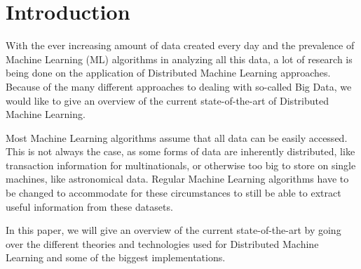 \section{Introduction}


With the ever increasing amount of data created every day and the prevalence of Machine Learning (ML) algorithms in analyzing all this data, a lot of research is being done on the application of Distributed Machine Learning approaches. Because of the many different approaches to dealing with so-called Big Data, we would like to give an overview of the current state-of-the-art of Distributed Machine Learning.

Most Machine Learning algorithms assume that all data can be easily accessed. This is not always the case, as some forms of data are inherently distributed, like transaction information for multinationals, or otherwise too big to store on single machines, like astronomical data. Regular Machine Learning algorithms have to be changed to accommodate for these circumstances to still be able to extract useful information from these datasets.

In this paper, we will give an overview of the current state-of-the-art by going over the different theories and technologies used for Distributed Machine Learning and some of the biggest implementations.
